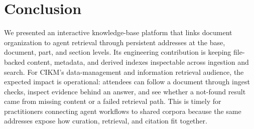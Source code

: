 \section{Conclusion}
\label{sec:conclusion}

We presented an interactive knowledge-base platform that links document
organization to agent retrieval through persistent addresses at the
base, document, part, and section levels. Its engineering contribution is
keeping file-backed content, metadata, and derived indexes inspectable
across ingestion and search. For CIKM's data-management and information
retrieval audience, the expected impact is operational: attendees can follow
a document through ingest checks, inspect evidence behind an answer, and see
whether a not-found result came from missing content or a failed retrieval
path. This is timely for practitioners connecting agent workflows to shared
corpora because the same addresses expose how curation, retrieval, and citation
fit together.

